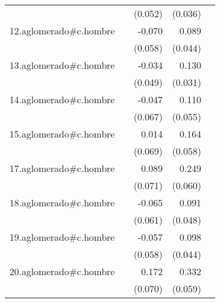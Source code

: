 {\begin{longtable}{l*{4}{D{.}{.}{-1}}}
            &                     &     (0.052)         &     (0.036)         &                     \\
\addlinespace
12.aglomerado#c.hombre&                     &      -0.070         &       0.089\sym{*}  &                     \\
            &                     &     (0.058)         &     (0.044)         &                     \\
\addlinespace
13.aglomerado#c.hombre&                     &      -0.034         &       0.130\sym{***}&                     \\
            &                     &     (0.049)         &     (0.031)         &                     \\
\addlinespace
14.aglomerado#c.hombre&                     &      -0.047         &       0.110\sym{*}  &                     \\
            &                     &     (0.067)         &     (0.055)         &                     \\
\addlinespace
15.aglomerado#c.hombre&                     &       0.014         &       0.164\sym{**} &                     \\
            &                     &     (0.069)         &     (0.058)         &                     \\
\addlinespace
17.aglomerado#c.hombre&                     &       0.089         &       0.249\sym{***}&                     \\
            &                     &     (0.071)         &     (0.060)         &                     \\
\addlinespace
18.aglomerado#c.hombre&                     &      -0.065         &       0.091         &                     \\
            &                     &     (0.061)         &     (0.048)         &                     \\
\addlinespace
19.aglomerado#c.hombre&                     &      -0.057         &       0.098\sym{*}  &                     \\
            &                     &     (0.058)         &     (0.044)         &                     \\
\addlinespace
20.aglomerado#c.hombre&                     &       0.172\sym{*}  &       0.332\sym{***}&                     \\
            &                     &     (0.070)         &     (0.059)         &                     \\

\end{longtable}}
